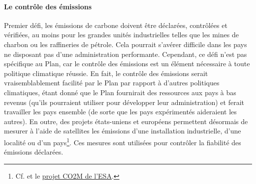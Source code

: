 \documentclass[a5paper,french,openany]{memoir}
\begin{document}
\paragraph{Le contrôle des émissions}
Premier défi, les émissions de carbone doivent être déclarées, contrôlées et vérifiées, au moins %
pour les grandes unités industrielles telles que les mines de charbon ou les raffineries de pétrole. Cela pourrait s'avérer difficile dans les pays ne disposant pas d'une administration performante. Cependant, ce défi n'est pas spécifique au Plan, car le contrôle des émissions est un élément nécessaire à toute politique climatique réussie. En fait, le contrôle des émissions serait vraisemblablement facilité par le Plan par rapport à d'autres politiques climatiques, étant donné que le Plan fournirait des ressources aux pays à bas revenus (qu'ils pourraient utiliser pour développer leur administration) et ferait travailler les pays ensemble (de sorte que les pays expérimentés aideraient les autres). En outre, des projets états-uniens et européens permettent désormais de mesurer à l'aide de satellites les émissions d'une installation industrielle, d'une localité ou d'un pays\footnote{Cf. \cite{nassar_quantifying_2017,pan_potential_2021,shen_national_2023} et le \href{https://www.esa.int/Applications/Observing_the_Earth/Copernicus/Carbon_dioxide_monitoring_satellite_given_the_shakes}{projet CO2M de l'ESA}.}. Ces mesures sont utilisées pour contrôler la fiabilité des émissions déclarées.
\end{document}
